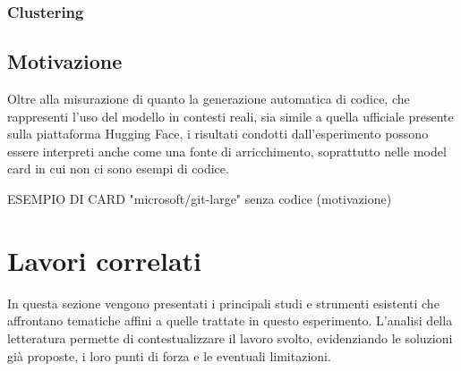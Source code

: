 \documentclass{article}
\begin{document}
\subsubsection{Clustering}


\subsection{Motivazione} \label{motivation}
Oltre alla misurazione di quanto la generazione automatica di codice, che rappresenti l'uso del modello in contesti reali, sia simile a quella ufficiale presente sulla piattaforma Hugging Face, i risultati condotti dall'esperimento possono essere interpreti anche come una fonte di arricchimento, soprattutto nelle model card in cui non ci sono esempi di codice.

ESEMPIO DI CARD "microsoft/git-large" senza codice (motivazione)

\section{Lavori correlati}
In questa sezione vengono presentati i principali studi e strumenti esistenti che affrontano tematiche affini a quelle trattate in questo esperimento. L'analisi della letteratura permette di contestualizzare il lavoro svolto, evidenziando le soluzioni già proposte, i loro punti di forza e le eventuali limitazioni.
\end{document}
